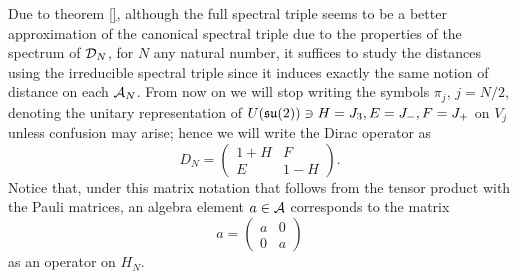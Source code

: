 







\linea

Due to theorem \ref{}, although the full spectral triple seems to be a better approximation of the canonical spectral triple due to the properties of the spectrum of $\mathcal D_N$, for $N$ any natural number, it suffices to study the distances using the irreducible spectral triple since it induces exactly the same notion of distance on each $\mathcal A_N$. From now on we will stop writing the symbols $\pi_j$, $j = N/2$, denoting the unitary representation of $U(\mathfrak{su}(2)) \ni H = J_3, E = J_-, F = J_+$ on $V_j$ unless confusion may arise; hence we will write the Dirac operator as
\begin{equation}
    D_N = \begin{pmatrix} 1 + H & F \\ E & 1 - H\end{pmatrix}.
\end{equation}
Notice that, under this matrix notation that follows from the tensor product with the Pauli matrices, an algebra element $a \in \mathcal A$ corresponds to the matrix
\begin{equation}\label{aAsMatrixOperator}
    a = \begin{pmatrix} a & 0 \\ 0 & a \end{pmatrix}
\end{equation} as an operator on $H_N$.

